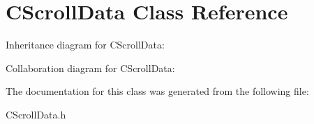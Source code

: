 \hypertarget{classCScrollData}{}\section{C\+Scroll\+Data Class Reference}
\label{classCScrollData}


Inheritance diagram for C\+Scroll\+Data\+:


Collaboration diagram for C\+Scroll\+Data\+:


The documentation for this class was generated from the following file\+:\begin{DoxyCompactItemize}
\item 
C\+Scroll\+Data.\+h\end{DoxyCompactItemize}

